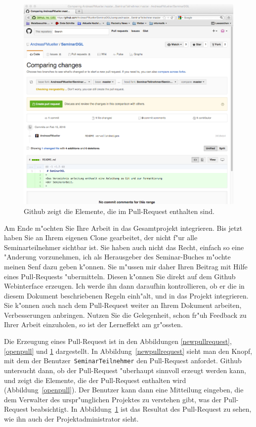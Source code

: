 \documentclass[a4paper,12pt]{article}
\begin{document}
\begin{figure}
\centering
\includegraphics[width=\hsize]{preparepullrequest.png}
\caption{Github zeigt die Elemente, die im Pull-Request enthalten sind.
\label{pullresult}}
\end{figure}
Am Ende m"ochten Sie Ihre Arbeit in das Gesamtprojekt integrieren.
Bis jetzt haben Sie an Ihrem eigenen Clone gearbeitet, der nicht f"ur
alle Seminarteilnehmer sichtbar ist.
Sie haben auch nicht das Recht, einfach so eine "Anderung vorzunehmen,
ich als Herausgeber des Seminar-Buches m"ochte meinen Senf dazu geben
k"onnen.
Sie m"ussen mir daher Ihren Beitrag mit Hilfe eines Pull-Requests
"ubermitteln.
Diesen k"onnen Sie direkt auf dem Github Webinterface erzeugen.
Ich werde ihn dann daraufhin kontrollieren, ob er die in diesem
Dokument beschriebenen Regeln einh"alt, und in das Projekt
integrieren.
Sie k"onnen auch nach dem Pull-Request weiter an Ihrem Dokument
arbeiten, Verbesserungen anbringen.
Nutzen Sie die Gelegenheit, schon fr"uh Feedback zu Ihrer Arbeit
einzuholen, so ist der Lerneffekt am gr"ossten.

Die Erzeugung eines Pull-Request ist in den Abbildungen
\ref{newpullrequest},
\ref{openpull}
und
\ref{pullresult} dargestellt.
In Abbildung~\ref{newpullrequest} sieht man den Knopf, mit dem der
Benutzer~\texttt{SeminarTeilnehmer} den Pull-Request anfordet.
Github untersucht dann, ob der Pull-Request "uberhaupt sinnvoll
erzeugt werden kann, und zeigt die Elemente, die der
Pull-Request enthalten wird (Abbildung~\ref{openpull}).
Der Benutzer kann dann eine Mitteilung eingeben, die dem Verwalter
des urspr"unglichen Projektes zu verstehen gibt, was der Pull-Request
beabsichtigt.
In Abbildung~\ref{pullresult} ist das Resultat des Pull-Request zu
sehen, wie ihn auch der Projektadministrator sieht.
\end{document}
